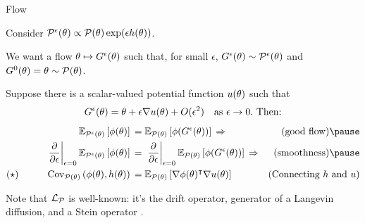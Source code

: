 \begin{frame}[t]{Flow}

Consider $\peps(\theta) \propto \p(\theta) \exp(\epsilon \h(\theta))$.

We want a flow $\theta \mapsto \feps(\theta)$ such that,
for small $\epsilon$, $\feps(\theta) \sim \peps(\theta)$ and
$\feps[0](\theta) = \theta \sim \p(\theta)$.\\[1em]

\pause

Suppose there is a scalar-valued potential function $\v(\theta)$ such that
$$
\feps(\theta) = \theta + \epsilon \nabla \v(\theta) + O(\epsilon^2)
\quad\textrm{as }\epsilon \rightarrow 0. \textrm{ Then:}
$$
%
\pause
$$
\begin{aligned}
  \expect{\peps(\theta)}{\phi(\theta)} ={}& \expect{\p(\theta)}{\phi(\feps(\theta))}
\Rightarrow & \textrm{(good flow)} \pause \\
\fracat{\partial}{\partial \epsilon}{\epsilon = 0}  
  \expect{\peps(\theta)}{\phi(\theta)} ={}&
\fracat{\partial}{\partial \epsilon}{\epsilon = 0}
  \expect{\p(\theta)}{\phi(\feps(\theta))} \Rightarrow
  & \textrm{(smoothness)} \pause 
\\
(\star) \quad\quad\quad 
\cov{\p(\theta)}{\phi(\theta), \h(\theta)}
={}&
  \expect{\p(\theta)}{\nabla \phi(\theta)^\trans 
                      \nabla \v(\theta) }
  & \textrm{(Connecting $\h$ and $\v$)}
\\
\end{aligned}
$$
%
\pause
%

Note that $\lotto$ is well-known: it's the drift operator, generator of a Langevin
diffusion, and a Stein operator \parencite{ambrosio2021lectures,song2021scorebasedgenerativemodelingstochastic,ross2011fundamentals}.


\end{frame}


